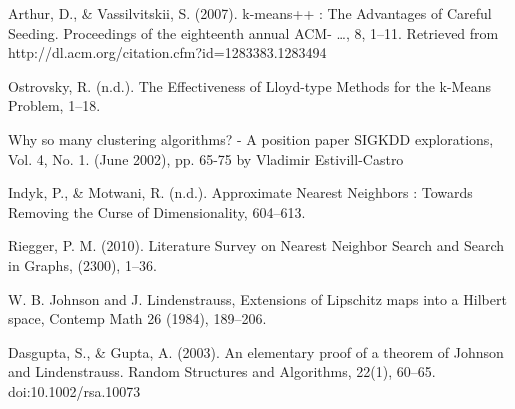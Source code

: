 \documentclass{article}
\begin{document}
\begin{thebibliography}{99}
     Arthur, D., \& Vassilvitskii, S. (2007). k-means++ : The Advantages of
        Careful Seeding. Proceedings of the eighteenth annual ACM- …, 8, 1–11.
        Retrieved from http://dl.acm.org/citation.cfm?id=1283383.1283494

     Ostrovsky, R. (n.d.). The Effectiveness of Lloyd-type
        Methods for the k-Means Problem, 1–18.

     Why so many clustering algorithms? - A position paper SIGKDD
        explorations, Vol. 4, No. 1. (June 2002), pp. 65-75 by Vladimir
        Estivill-Castro

     Indyk, P., \& Motwani, R. (n.d.). Approximate Nearest Neighbors :
        Towards Removing the Curse of Dimensionality, 604–613.

     Riegger, P. M. (2010). Literature Survey on Nearest Neighbor Search and Search in Graphs, (2300), 1–36.

     W. B. Johnson and J. Lindenstrauss, Extensions of Lipschitz maps into a Hilbert space, Contemp Math 26 (1984), 189–206.

     Dasgupta, S., \& Gupta, A. (2003). An elementary proof of a theorem of Johnson and Lindenstrauss. Random Structures and Algorithms, 22(1), 60–65. doi:10.1002/rsa.10073
\end{thebibliography}
\end{document}
